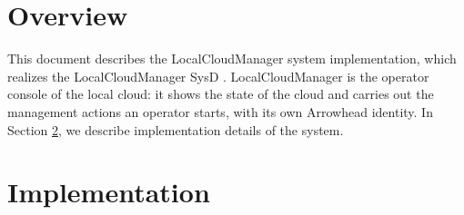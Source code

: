 \documentclass[a4paper]{arrowhead}
\begin{document}
\sloppy

\ArrowheadSetup

\begin{center}
  \vspace*{1cm}
  \huge{\arrowtitle}

  \vspace*{0.2cm}
  \LARGE{\arrowtype}
  \vspace*{1cm}

  \vspace*{\fill}


  \vspace*{1cm}
  \vspace*{\fill}

  \begin{abstract}
    This document describes the design and implementation of the LocalCloudManager support system of Arrowhead 5.2.2 (\texttt{ah5-LocalCloudManager-java-spring}).
  \end{abstract}

  \vspace*{1cm}
\end{center}

\newpage

\tableofcontents
\newpage

\section{Overview}
\label{sec:overview}

This document describes the LocalCloudManager system implementation, which realizes the LocalCloudManager SysD \cite{lcm-sysd}. LocalCloudManager is the operator console of the local cloud: it shows the state of the cloud and carries out the management actions an operator starts, with its own Arrowhead identity.
In Section \ref{Implementation}, we describe implementation details of the system.

\newpage

\section{Implementation}
\label{Implementation}
\end{document}
